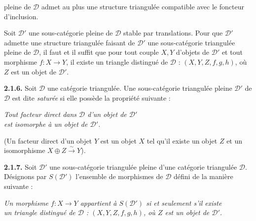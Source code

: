 \clearpage
{}%
\begingroup
\small
\setlength{\emergencystretch}{1.5em}%
\setlength{\abovedisplayskip}{2pt plus 1pt minus 1pt}%
\setlength{\belowdisplayskip}{2pt plus 1pt minus 1pt}%

\noindent pleine de $\mathcal D$ admet au plus une structure triangulée
compatible avec le foncteur d'inclusion.

Soit $\mathcal D'$ une sous-catégorie pleine de $\mathcal D$ stable par
translations. Pour que $\mathcal D'$ admette une structure triangulée faisant
de $\mathcal D'$ une sous-catégorie triangulée pleine de $\mathcal D$, il faut
et il suffit que pour tout couple $X,Y$ d'objets de $\mathcal D'$ et tout
morphisme $f\colon X\to Y$, il existe un triangle distingué de $\mathcal D$ :
$(X,Y,Z,f,g,h)$, où $Z$ est un objet de $\mathcal D'$.

\medskip
\noindent\textbf{2.1.6.}\quad
{}
Soit $\mathcal D$ une catégorie triangulée. Une sous-catégorie triangulée
pleine $\mathcal D'$ de $\mathcal D$ est dite \emph{saturée} si elle possède
la propriété suivante :

\par\smallskip
\noindent{}%
\begin{minipage}[t]{\linewidth}
  \centering\itshape
  Tout facteur direct dans $\mathcal D$ d'un objet de $\mathcal D'$\\[-1pt]
  est isomorphe à un objet de $\mathcal D'$.
\end{minipage}
\par\smallskip

\noindent (Un facteur direct d'un objet $Y$ est un objet $X$ tel qu'il existe
un objet $Z$ et un isomorphisme $X\oplus Z\xrightarrow{\sim}Y$).

\medskip
\noindent\textbf{2.1.7.}\quad
{}
Soit $\mathcal D'$ une sous-catégorie triangulée pleine d'une catégorie
triangulée $\mathcal D$. Désignons par $S(\mathcal D')$ l'ensemble de
morphismes de $\mathcal D$ défini de la manière suivante :

\par\smallskip
\noindent{}%
\begin{minipage}[t]{\linewidth}
  \centering\itshape
  Un morphisme $f\colon X\to Y$ appartient à $S(\mathcal D')$ si et seulement s'il existe\\[-1pt]
  un triangle distingué de $\mathcal D$ : $(X,Y,Z,f,g,h)$, où $Z$ est un objet de $\mathcal D'$.
\end{minipage}
\par\smallskip

